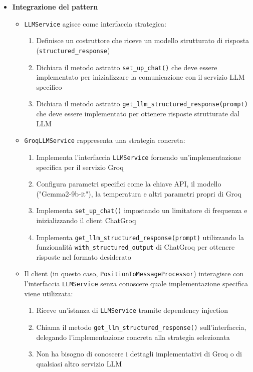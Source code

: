 \documentclass[10pt]{article}
\begin{document}
\begin{itemize}
    \item \textbf{Integrazione del pattern}
    \begin{itemize}
        \item \texttt{LLMService} agisce come interfaccia strategica:
        \begin{enumerate}
            \item Definisce un costruttore che riceve un modello strutturato di risposta (\texttt{structured\_response})
            \item Dichiara il metodo astratto \texttt{set\_up\_chat()} che deve essere implementato per inizializzare la comunicazione con il servizio LLM specifico
            \item Dichiara il metodo astratto \texttt{get\_llm\_structured\_response(prompt)} che deve essere implementato per ottenere risposte strutturate dal LLM
        \end{enumerate}
        
        \item \texttt{GroqLLMService} rappresenta una strategia concreta:
        \begin{enumerate}
            \item Implementa l'interfaccia \texttt{LLMService} fornendo un'implementazione specifica per il servizio Groq
            \item Configura parametri specifici come la chiave API, il modello ("Gemma2-9b-it"), la temperatura e altri parametri propri di Groq
            \item Implementa \texttt{set\_up\_chat()} impostando un limitatore di frequenza e inizializzando il client ChatGroq
            \item Implementa \texttt{get\_llm\_structured\_response(prompt)} utilizzando la funzionalità \texttt{with\_structured\_output} di ChatGroq per ottenere risposte nel formato desiderato
        \end{enumerate}
        
        \item Il client (in questo caso, \texttt{PositionToMessageProcessor}) interagisce con l'interfaccia \texttt{LLMService} senza conoscere quale implementazione specifica viene utilizzata:
        \begin{enumerate}
            \item Riceve un'istanza di \texttt{LLMService} tramite dependency injection
            \item Chiama il metodo \texttt{get\_llm\_structured\_response()} sull'interfaccia, delegando l'implementazione concreta alla strategia selezionata
            \item Non ha bisogno di conoscere i dettagli implementativi di Groq o di qualsiasi altro servizio LLM
        \end{enumerate}
        

\end{itemize}
\end{itemize}
\end{document}
